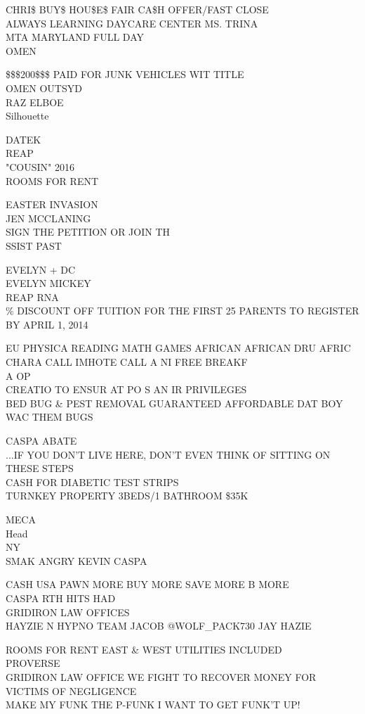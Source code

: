 \documentclass[10pt,letterpaper]{article}
\begin{document}
CHRI\$ BUY\$ HOU\$E\$ FAIR CA\$H OFFER/FAST CLOSE\\
ALWAYS LEARNING DAYCARE CENTER MS. TRINA\\
MTA MARYLAND FULL DAY\\
OMEN

\$\$\$200\$\$\$ PAID FOR JUNK VEHICLES WIT TITLE\\
OMEN OUTSYD\\
RAZ ELBOE\\
Silhouette

DATEK\\
REAP\\
"COUSIN" 2016\\
ROOMS FOR RENT

EASTER INVASION\\
JEN MCCLANING\\
SIGN THE PETITION OR JOIN TH\\
SSIST PAST

EVELYN + DC\\
EVELYN MICKEY\\
REAP RNA\\
\% DISCOUNT OFF TUITION FOR THE FIRST 25 PARENTS TO REGISTER BY APRIL 1, 2014

EU PHYSICA READING MATH GAMES AFRICAN AFRICAN DRU AFRIC CHARA CALL IMHOTE CALL A NI FREE BREAKF\\
A OP\\
CREATIO TO ENSUR AT PO S AN IR PRIVILEGES\\
BED BUG \& PEST REMOVAL GUARANTEED AFFORDABLE DAT BOY WAC THEM BUGS

CASPA ABATE\\
...IF YOU DON'T LIVE HERE, DON'T EVEN THINK OF SITTING ON THESE STEPS\\
CASH FOR DIABETIC TEST STRIPS\\
TURNKEY PROPERTY 3BEDS/1 BATHROOM \$35K

MECA\\
Head\\
NY\\
SMAK ANGRY KEVIN CASPA

CASH USA PAWN MORE BUY MORE SAVE MORE B MORE\\
CASPA RTH HITS HAD\\
GRIDIRON LAW OFFICES\\
HAYZIE N HYPNO TEAM JACOB @WOLF\_PACK730 JAY HAZIE

ROOMS FOR RENT EAST \& WEST UTILITIES INCLUDED\\
PROVERSE\\
GRIDIRON LAW OFFICE WE FIGHT TO RECOVER MONEY FOR VICTIMS OF NEGLIGENCE\\
MAKE MY FUNK THE P{-}FUNK I WANT TO GET FUNK'T UP!
\end{document}
